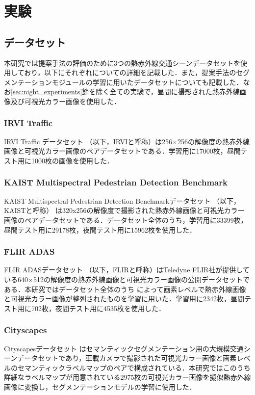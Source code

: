 \documentclass[11pt,dvipdfmx]{ujreport}
\begin{document}
\chapter{実験}

\section{データセット}
本研究では提案手法の評価のために3つの熱赤外線交通シーンデータセットを使用しており，以下にそれぞれについての詳細を記載した．また，提案手法のセグメンテーションモジュールの学習に用いたデータセットについても記載した．なお\ref{sec:night_experiments}節を除く全ての実験で，昼間に撮影された熱赤外線画像及び可視光カラー画像を使用した．

\subsection{IRVI Traffic}
IRVI Traffic データセット \cite{Li_2021_ACMMM_I2VGAN} （以下，IRVIと呼称）は256$\times$256の解像度の熱赤外線画像と可視光カラー画像のペアデータセットである．学習用に17000枚，昼間テスト用に1000枚の画像を使用した．

\subsection{KAIST Multispectral Pedestrian Detection Benchmark}
KAIST Multispectral Pedestrian Detection Benchmarkデータセット \cite{Hwang_2015_CVPR_KAIST}（以下，KAISTと呼称） は320x256の解像度で撮影された熱赤外線画像と可視光カラー画像のペアデータセットである．データセット全体のうち，学習用に33399枚，昼間テスト用に29178枚，夜間テスト用に15962枚を使用した．

\subsection{FLIR ADAS}
FLIR ADASデータセット \cite{FLIRDataset} （以下，FLIRと呼称）はTeledyne FLIR社が提供している640$\times$512の解像度の熱赤外線画像と可視光カラー画像の公開データセットである．本研究ではデータセット全体のうち \cite{Zhang_2020_ICIP_FLIR-Aligned} によって画素レベルで熱赤外線画像と可視光カラー画像が整列されたものを学習に用いた．学習用に2342枚，昼間テスト用に702枚，夜間テスト用に4535枚を使用した．

\subsection{Cityscapes}
Cityscapesデータセット \cite{Cordts_2016_CVPR_Cityscapes} はセマンティックセグメンテーション用の大規模交通シーンデータセットであり，車載カメラで撮影された可視光カラー画像と画素レベルのセマンティックラベルマップのペアで構成されている．本研究ではこのうち詳細なラベルマップが用意されている2975枚の可視光カラー画像を擬似熱赤外線画像に変換し，セグメンテーションモデルの学習に使用した．
\end{document}
